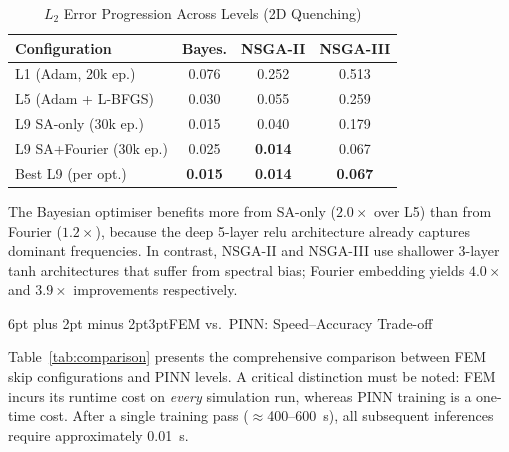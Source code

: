 \documentclass[10pt, twocolumn]{article}
\makeatletter
\renewcommand{\subsection}{\@startsection{subsection}{2}{0pt}%
  {6pt plus 2pt minus 2pt}{3pt}{\normalfont\bfseries\itshape}}
\makeatother
\begin{document}
\begin{table}[h]
\centering
\caption{$L_2$ Error Progression Across Levels (2D Quenching)}
\label{tab:progression}
\small
\begin{tabular}{lccc}
\toprule
\textbf{Configuration} & \textbf{Bayes.} & \textbf{NSGA-II} & \textbf{NSGA-III} \\
\midrule
L1 (Adam, 20k ep.)       & 0.076 & 0.252 & 0.513 \\
L5 (Adam + L-BFGS)       & 0.030 & 0.055 & 0.259 \\
L9 SA-only (30k ep.)     & 0.015 & 0.040 & 0.179 \\
L9 SA+Fourier (30k ep.)  & 0.025 & \textbf{0.014} & 0.067 \\
\midrule
Best L9 (per opt.)       & \textbf{0.015} & \textbf{0.014} & \textbf{0.067} \\
\bottomrule
\end{tabular}
\end{table}

The Bayesian optimiser benefits more from SA-only ($2.0\times$ over L5) than from Fourier
($1.2\times$), because the deep 5-layer relu architecture already captures dominant
frequencies. In contrast, NSGA-II and NSGA-III use shallower 3-layer tanh architectures
that suffer from spectral bias; Fourier embedding yields $4.0\times$ and $3.9\times$
improvements respectively.

\subsection{FEM vs.\ PINN: Speed--Accuracy Trade-off}

Table~\ref{tab:comparison} presents the comprehensive comparison between FEM skip
configurations and PINN levels. A critical distinction must be noted: FEM incurs its
runtime cost on \emph{every} simulation run, whereas PINN training is a one-time cost.
After a single training pass ($\approx$400--600~s), all subsequent inferences require
approximately 0.01~s.
\end{document}
